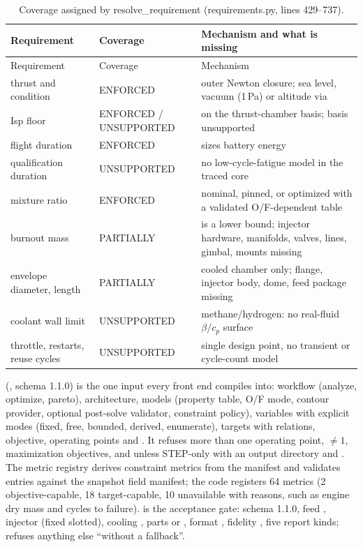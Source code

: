 {\footnotesize
\begin{longtable}{@{}P{3.6cm}P{3.0cm}P{9.2cm}@{}}
\caption{Coverage assigned by resolve\_requirement (requirements.py, lines 429--737).}\label{tab:s13-coverage}\\
\toprule
Requirement & Coverage & Mechanism and what is missing\\
\midrule\endfirsthead
\toprule Requirement & Coverage & Mechanism\\ \midrule\endhead
thrust and condition & ENFORCED & outer Newton closure; sea level, vacuum (1\,Pa) or altitude via \\
Isp floor & ENFORCED / UNSUPPORTED &  on the thrust-chamber basis;  basis unsupported\\
flight duration & ENFORCED & sizes battery energy\\
qualification duration & UNSUPPORTED & no low-cycle-fatigue model in the traced core\\
mixture ratio & ENFORCED & nominal, pinned, or optimized with a validated O/F-dependent table\\
burnout mass & PARTIALLY &  is a lower bound; injector hardware, manifolds, valves, lines, gimbal, mounts missing\\
envelope diameter, length & PARTIALLY & cooled chamber only; flange, injector body, dome, feed package missing\\
coolant wall limit & UNSUPPORTED & methane/hydrogen: no real-fluid $\beta/c_p$ surface\\
throttle, restarts, reuse cycles & UNSUPPORTED & single design point, no transient or cycle-count model\\
\bottomrule
\end{longtable}
}

 (, schema 1.1.0) is the one input every front end compiles into: workflow (analyze, optimize, pareto), architecture, models (property table, O/F mode, contour provider, optional post-solve validator, constraint policy), variables with explicit modes (fixed, free, bounded, derived, enumerate), targets with relations, objective, operating points and . It refuses more than one operating point, $\neq1$, maximization objectives, and  unless STEP-only with an output directory and . The metric registry derives constraint metrics from the manifest and validates entries against the snapshot field manifest; the code registers 64 metrics (2 objective-capable, 18 target-capable, 10 unavailable with reasons, such as engine dry mass and cycles to failure).  is the acceptance gate: schema 1.1.0, feed , injector  (fixed slotted), cooling , parts  or , format , fidelity , five report kinds;  refuses anything else ``without a fallback''.

